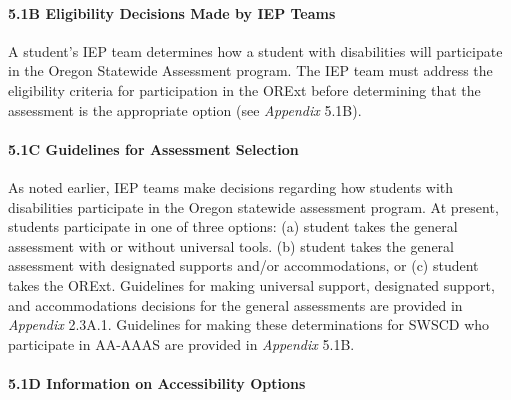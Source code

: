 \documentclass[]{article}
\let\oldparagraph\paragraph
\renewcommand{\paragraph}[1]{\oldparagraph{#1}\mbox{}}
\begin{document}
\paragraph{5.1B Eligibility Decisions Made by IEP
Teams}\label{b-eligibility-decisions-made-by-iep-teams}

A student's IEP team determines how a student with disabilities will
participate in the Oregon Statewide Assessment program. The IEP team
must address the eligibility criteria for participation in the ORExt
before determining that the assessment is the appropriate option (see
\emph{Appendix} 5.1B).

\paragraph{5.1C Guidelines for Assessment
Selection}\label{c-guidelines-for-assessment-selection}

As noted earlier, IEP teams make decisions regarding how students with
disabilities participate in the Oregon statewide assessment program. At
present, students participate in one of three options: (a) student takes
the general assessment with or without universal tools. (b) student
takes the general assessment with designated supports and/or
accommodations, or (c) student takes the ORExt. Guidelines for making
universal support, designated support, and accommodations decisions for
the general assessments are provided in \emph{Appendix} 2.3A.1.
Guidelines for making these determinations for SWSCD who participate in
AA-AAAS are provided in \emph{Appendix} 5.1B.

\paragraph{5.1D Information on Accessibility
Options}\label{d-information-on-accessibility-options}
\end{document}

